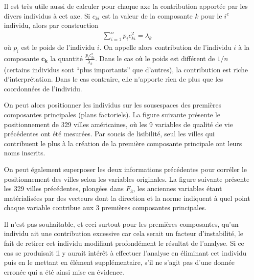 \documentclass[letterpaper,10pt,english]{jupyterBook}
\begin{document}
\sphinxAtStartPar
Il est très utile aussi de calculer pour chaque axe la contribution apportée par les divers individus à cet axe. Si \(c_{ki}\) est la valeur de la composante \(k\) pour le \(i^e\) individu, alors par construction
\begin{equation*}
\begin{split}\displaystyle\sum_{i=1}^np_ic_{ki}^2=\lambda_k\end{split}
\end{equation*}
\sphinxAtStartPar
où \(p_i\) est le poids de l’individu \(i\). On appelle alors contribution de l’individu \(i\) à la composante \(\mathbf{c_k}\) la quantité \(\frac{p_ic_{ki}^2}{\lambda_k}\). Dans le cas où le poids est différent de \(1/n\) (certains individus sont “plus importants” que d’autres), la contribution est riche d’interprétation. Dans le cas contraire, elle n’apporte rien de plus que les coordonnées de l’individu.

\sphinxAtStartPar
On peut alors positionner les individus sur les sous\sphinxhyphen{}espaces des premières composantes principales (plans factoriels). La figure suivante présente le positionnement de 329 villes américaines, où les 9 variables de qualité de vie précédentes ont été mesurées. Par soucis de lisibilité, seul les villes qui contribuent le plus à la création de la première composante principale ont leurs noms inscrits.

\sphinxAtStartPar
{}

\sphinxAtStartPar
On peut également superposer les deux informations précédentes pour corréler le positionnement des villes selon les variables originales. La figure suivante présente les 329 villes précédentes, plongées dans \(F_3\), les  anciennes variables étant matérialisées par des vecteurs dont la direction et la norme indiquent à quel point chaque variable contribue aux 3 premières composantes principales.

\sphinxAtStartPar
{}

\sphinxAtStartPar
Il n’est pas souhaitable, et ceci surtout pour les premières composantes,  qu’un individu ait une contribution excessive car cela serait un facteur d’instabilité, le fait de retirer cet individu modifiant profondément le résultat de l’analyse. Si ce cas se produisait il y aurait intérêt à effectuer l’analyse en éliminant cet individu puis en le mettant en élément supplémentaire, s’il ne s’agit pas d’une donnée erronée qui a été ainsi mise en évidence.
\end{document}
